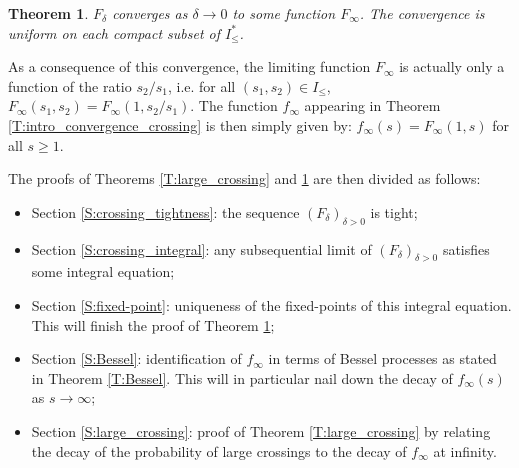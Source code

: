 \documentclass[11pt]{article}
\newtheorem{theorem}{Theorem}[section]
\theoremstyle{remark}
\newtheorem{remark}[theorem]{Remark}
\numberwithin{equation}{section}
\begin{document}
\begin{theorem}\label{T:convergence_crossing}
$F_\delta$ converges as $\delta \to 0$ to some function $F_\infty$. The convergence is uniform on each compact subset of $I_\leq^*$.
\end{theorem}

As a consequence of this convergence, the limiting function $F_\infty$ is actually only a function of the ratio $s_2/s_1$, i.e. for all $(s_1,s_2) \in I_\leq$, $F_\infty(s_1,s_2) = F_\infty(1,s_2/s_1)$. The function $f_\infty$ appearing in Theorem \ref{T:intro_convergence_crossing} is then simply given by: $f_\infty(s) = F_\infty(1,s)$ for all $s \geq 1$.

\medskip

The proofs of Theorems \ref{T:large_crossing} and \ref{T:convergence_crossing} are then divided as follows:
\begin{itemize}
\item
Section \ref{S:crossing_tightness}: 
the sequence $(F_\delta)_{\delta >0}$ is tight;
\item
Section \ref{S:crossing_integral}: any subsequential limit of $(F_\delta)_{\delta >0}$ satisfies some integral equation;
\item
Section \ref{S:fixed-point}: uniqueness of the fixed-points of this integral equation. This will finish the proof of Theorem \ref{T:convergence_crossing};
\item
Section \ref{S:Bessel}: identification of $f_\infty$ in terms of Bessel processes as stated in Theorem \ref{T:Bessel}. This will in particular nail down the decay of $f_\infty(s)$ as $s \to \infty$;
\item
Section \ref{S:large_crossing}: proof of Theorem \ref{T:large_crossing} by relating the decay of the probability of large crossings to the decay of $f_\infty$ at infinity. 
\end{itemize}
\end{document}
